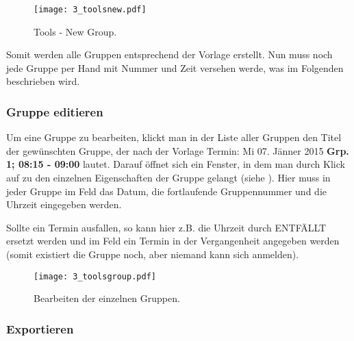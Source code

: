 \begin{figure}[htbp]
  \begin{center}
  \texttt{[image: 3\_toolsnew.pdf]}
  \caption{ Tools - New Group.}
  \label{fig:toolsnew}
  \end{center}
\end{figure}

Somit werden alle Gruppen entsprechend der Vorlage erstellt. Nun muss noch jede
Gruppe per Hand mit Nummer und Zeit versehen werde, was im Folgenden beschrieben
wird.

\subsubsection{Gruppe editieren}

Um eine Gruppe zu bearbeiten, klickt man in der Liste aller Gruppen den Titel
der gewünschten Gruppe, der nach der Vorlage 
\glqq{}Termin: Mi 07. Jänner 2015 {\bf Grp. 1; 08:15 - 09:00}\grqq{} lautet.
Darauf öffnet sich ein Fenster, in dem man durch Klick auf 
zu den einzelnen Eigenschaften der Gruppe gelangt (siehe 
). Hier muss in jeder Gruppe im Feld  das
Datum, die fortlaufende Gruppennummer und die Uhrzeit eingegeben werden.

Sollte ein Termin ausfallen, so kann hier z.B. die Uhrzeit durch 
\glqq{}ENTFÄLLT\grqq{} ersetzt werden und im Feld 
ein Termin in der Vergangenheit angegeben werden (somit existiert die Gruppe
noch, aber niemand kann sich anmelden).

\begin{figure}[htbp]
  \texttt{[image: 3\_toolsgroup.pdf]}
  \caption{ Bearbeiten der einzelnen Gruppen.}
  \label{fig:toolsgroup}
\end{figure}

\newpage
\subsubsection{Exportieren}

